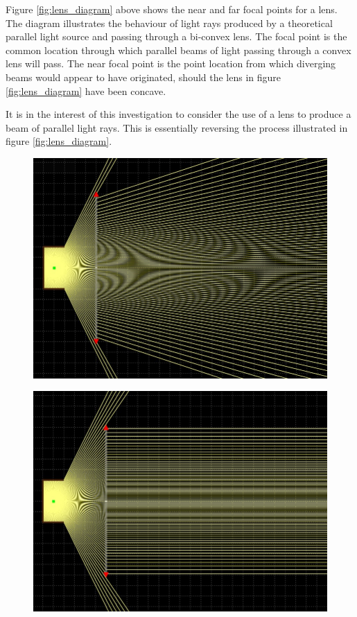 Figure \ref{fig:lens_diagram} above shows the near and far focal points for a lens. The diagram illustrates the behaviour of light rays produced by a theoretical parallel light source and passing through a bi-convex lens. The focal point is the common location through which parallel beams of light passing through a convex lens will pass. The near focal point is the point location from which diverging beams would appear to have originated, should the lens in figure \ref{fig:lens_diagram} have been concave.

It is in the interest of this investigation to consider the use of a lens to produce a beam of parallel light rays. This is essentially reversing the process illustrated in figure \ref{fig:lens_diagram}.

\begin{figure}[H]
	\centering
	\begin{minipage}{.3\textwidth}
		\centering
		\includegraphics[width=.9\linewidth]{figures/litreview/lens_divergent_beam.JPG}
		\label{fig:lens_divergent}
	\end{minipage}%
	\begin{minipage}{.3\textwidth}
		\centering
		\includegraphics[width=.9\linewidth]{figures/litreview/lens_parallel_beam.JPG}

\end{minipage}
\end{figure}
